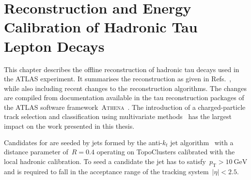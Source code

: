 \chapter{Reconstruction and Energy Calibration of Hadronic Tau Lepton Decays}
\label{sec:reconstruction}

%
%
This chapter describes the offline reconstruction of hadronic tau decays used in
the ATLAS experiment. It summarises the reconstruction as given in Refs.\
\cite{atlas:taurec:run1, atlas:taurec:run2}, while also including recent changes
to the reconstruction algorithms. The changes are compiled from documentation
available in the tau reconstruction packages of the ATLAS software
framework~\textsc{Athena}~\cite{athena}. The introduction of a charged-particle
track selection and classification using multivariate methods~\cite{duschinger}
has the largest impact on the work presented in this thesis.

Candidates for \tauhadvis are seeded by jets formed by the anti-$k_t$ jet
algorithm~\cite{antikt} with a distance parameter of~$R = 0.4$ operating on
TopoClusters calibrated with the local hadronic calibration. To seed a
\tauhadvis candidate the jet has to satisfy~$p_\text{T} > \SI{10}{\GeV}$ and is
required to fall in the acceptance range of the tracking
system~$|\eta| < \num{2.5}$.

